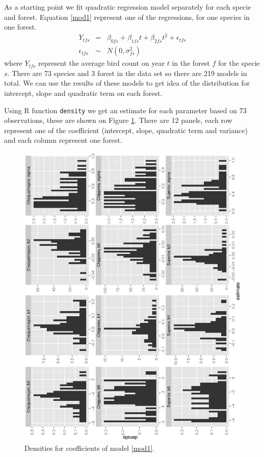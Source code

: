 \documentclass{article}
\begin{document}
As a starting point we fit quadratic regression model separately for each specie and forest. Equation \ref{mod1} represent one of the regressions, for one species in one forest. 
\begin{eqnarray}
\nonumber Y_{tfs} &=&  \beta_{0fs} + \beta_{1fs}t + \beta_{2fs}t^2 + \epsilon_{tfs}  \\
\epsilon_{tfs} &\sim& N(0,\sigma_{fs}^2)
\label{mod1}
\end{eqnarray}
where $Y_{tfs}$ represent the average bird count on year $t$ in the forest $f$ for the specie $s$. There are 73 species and 3 forest in the data set so there are 219 models in total. We can use the results of these models to get idea of the distribution for intercept, slope and quadratic term on each forest. 

Using R function {\tt density} we get an estimate for each parameter based on 73 observations, these are shown on Figure \ref{histm1}. There are 12 panels, each row represent one of the coefficient (intercept, slope, quadratic term and variance) and each column represent one forest. 
\begin{figure}[h!]
\centering
\includegraphics[scale=.5, angle=-90]{hist_m1.ps}
\caption{Densities for coefficients of model \ref{mod1}. \label{histm1}}
\end{figure}
\end{document}
